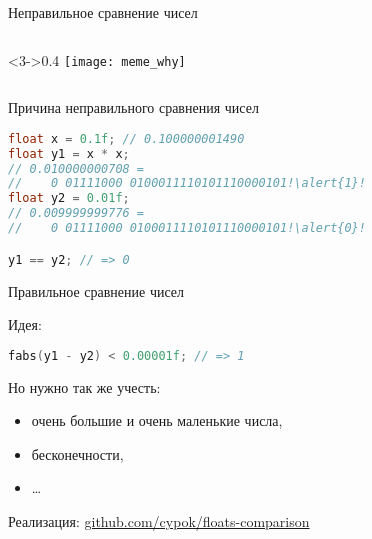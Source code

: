 \begin{backup}
\begin{frame}[fragile]{Неправильное сравнение чисел}
\begin{columns}[onlytextwidth,c]
    \begin{column}<3->{0.4\textwidth}
      \texttt{[image: meme\_why]}
    \end{column}

  \end{columns}

\end{frame}

\begin{frame}[fragile]{Причина неправильного сравнения чисел}

  \begin{lstlisting}[language=C,escapechar=\!]
float x = 0.1f; // 0.100000001490
float y1 = x * x;
// 0.010000000708 =
//    0 01111000 0100011110101110000101!\alert{1}!
float y2 = 0.01f;
// 0.009999999776 =
//    0 01111000 0100011110101110000101!\alert{0}!

y1 == y2; // => 0
  \end{lstlisting}

\end{frame}

\begin{frame}[fragile]{Правильное сравнение чисел}

  Идея:
  \begin{lstlisting}[language=C]
fabs(y1 - y2) < 0.00001f; // => 1
  \end{lstlisting}

  \pause

  Но нужно так же учесть:
  \begin{itemize}
    \item очень большие и очень маленькие числа,
    \item бесконечности,
    \item \ldots
  \end{itemize}

  Реализация: \href{%
    https://github.com/cypok/floats-comparison%
  }{%
    github.com/cypok/floats-comparison
  }

\end{frame}


\end{backup}




